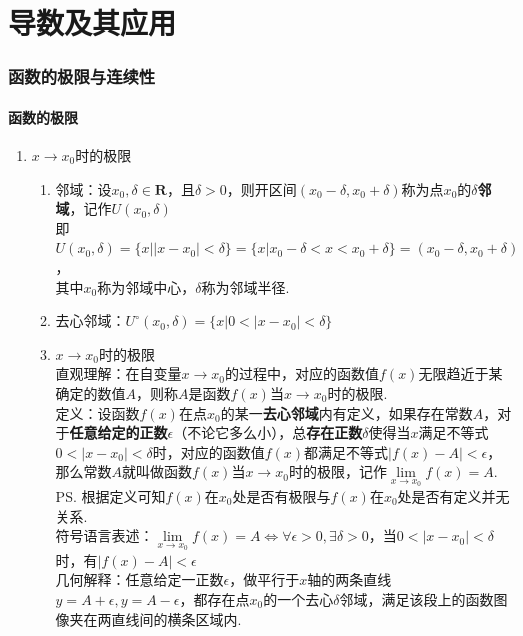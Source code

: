 \chapter*{导数及其应用}
\subsection*{函数的极限与连续性}
\subsubsection*{函数的极限}
\begin{enumerate}
    \item $x \rightarrow x_0$时的极限
    \begin{enumerate}
        \item 邻域：设$x_0, \delta \in \mathbf{R}$，且$\delta > 0$，则开区间$(x_0 - \delta, x_0 + \delta)$称为点$x_0$的$\delta$\textbf{邻域}，记作$U(x_0, \delta)$ \\
        即$U(x_0, \delta) =  \{x | |x-x_0| < \delta\} = \{x | x_0 - \delta < x < x_0 + \delta \} = (x_0 - \delta, x_0 + \delta)$，\\
        其中$x_0$称为邻域中心，$\delta$称为邻域半径.
        \item 去心邻域：$U^{\circ}(x_0, \delta) =  \{x | 0 < |x-x_0| < \delta\}$
        \item $x \rightarrow x_0$时的极限\\
        直观理解：在自变量$x \rightarrow x_0$的过程中，对应的函数值$f(x)$无限趋近于某确定的数值$A$，则称$A$是函数$f(x)$当$x \rightarrow x_0$时的极限. \\
        定义：设函数$f(x)$在点$x_0$的某一\textbf{去心邻域}内有定义，如果存在常数$A$，对于\textbf{任意给定的正数}$\epsilon$（不论它多么小），总\textbf{存在正数}$\delta$使得当$x$满足不等式$0 < |x-x_0| < \delta$时，对应的函数值$f(x)$都满足不等式$|f(x)-A| < \epsilon$，那么常数$A$就叫做函数$f(x)$当$x \rightarrow x_0$时的极限，记作$\lim\limits_{x \to x_0}f(x) = A$. \\
        \ps 根据定义可知$f(x)$在$x_0$处是否有极限与$f(x)$在$x_0$处是否有定义并无关系. \\
        符号语言表述：$\lim\limits_{x \to x_0}f(x) = A \Longleftrightarrow \forall \epsilon > 0 , \exists \delta > 0$，当$0 < |x-x_0| < \delta$时，有$|f(x)-A| < \epsilon$ \\
        几何解释：任意给定一正数$\epsilon$，做平行于$x$轴的两条直线$y = A + \epsilon, y = A - \epsilon$，都存在点$x_0$的一个去心$\delta$邻域，满足该段上的函数图像夹在两直线间的横条区域内.

\end{enumerate}
\end{enumerate}
